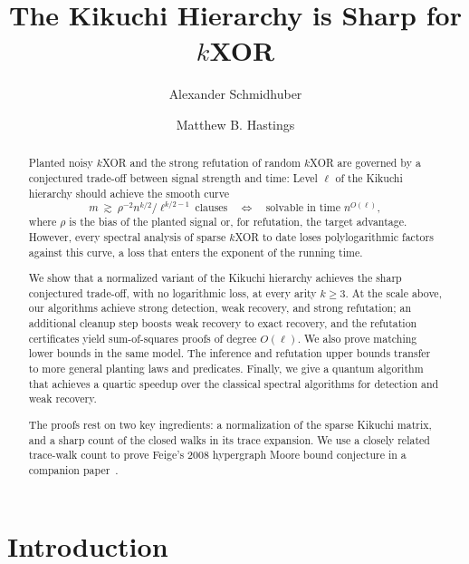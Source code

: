 \documentclass[11pt]{article}
\title{The Kikuchi Hierarchy is Sharp for $k$XOR}
\author[1,2]{Alexander Schmidhuber}
\author[2]{Matthew B. Hastings}
\affil[1]{Center for Theoretical Physics, MIT}
\affil[2]{Microsoft Station Q}
\date{}
\theoremstyle{definition}
\theoremstyle{remark}
\newcommand{\1}{\mathbf 1}
\numberwithin{equation}{section}
\begin{document}
\maketitle

\begin{abstract}
Planted noisy $k$XOR and the strong refutation of random $k$XOR are
 governed by a conjectured trade-off between signal strength and time: Level $\ell$ of the Kikuchi hierarchy should achieve the smooth curve
\begin{equation*}
 m\ \gtrsim\ \rho^{-2}n^{k/2}/\ell^{k/2-1}\ \text{clauses}
 \quad\Longleftrightarrow\quad
 \text{solvable in time }n^{O(\ell)},
\end{equation*}
where $\rho$ is the bias of the planted signal or, for refutation, the
target advantage.  However, every spectral analysis of sparse $k$XOR to date
loses polylogarithmic factors against this curve, a loss that enters the exponent of the running time.

We show that a normalized variant of the Kikuchi hierarchy
achieves the sharp conjectured trade-off, with no
logarithmic loss, at every arity $k\ge3$.  At the scale above, our
algorithms achieve strong detection, weak recovery, and
strong refutation; an additional cleanup step boosts
weak recovery to exact recovery, and the refutation certificates yield sum-of-squares proofs of degree $O(\ell)$.  We also prove matching lower bounds in the same model.  The inference and refutation upper bounds transfer to more general planting laws and predicates.
Finally, we give a quantum algorithm that achieves a quartic speedup
over the classical spectral algorithms for detection and weak recovery.

The proofs rest on two key ingredients: a  normalization of the sparse Kikuchi matrix, and a
sharp count of the closed walks in its trace expansion. We use a closely related trace-walk count to prove Feige's 2008 hypergraph Moore bound conjecture in a companion paper~\cite{SHmoore}.
\end{abstract}

\section{Introduction}\label{sec:intro}
\end{document}
